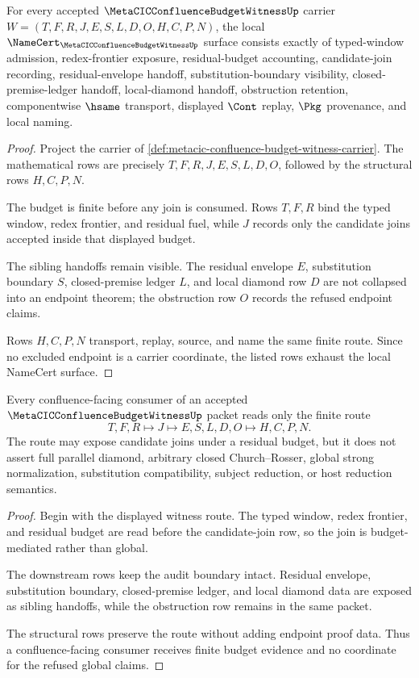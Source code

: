\begin{theorem}
\label{thm:metacic-confluence-budget-witness-namecert-obligations}
For every accepted $\MetaCICConfluenceBudgetWitnessUp$ carrier $W=(T,F,R,J,E,S,L,D,O,H,C,P,N)$, the local $\NameCert_{\MetaCICConfluenceBudgetWitnessUp}$ surface consists exactly of typed-window admission, redex-frontier exposure, residual-budget accounting, candidate-join recording, residual-envelope handoff, substitution-boundary visibility, closed-premise-ledger handoff, local-diamond handoff, obstruction retention, componentwise $\hsame$ transport, displayed $\Cont$ replay, $\Pkg$ provenance, and local naming.
\end{theorem}
\begin{proof}
Project the carrier of \autoref{def:metacic-confluence-budget-witness-carrier}. The mathematical rows are precisely $T,F,R,J,E,S,L,D,O$, followed by the structural rows $H,C,P,N$.

The budget is finite before any join is consumed. Rows $T,F,R$ bind the typed window, redex frontier, and residual fuel, while $J$ records only the candidate joins accepted inside that displayed budget.

The sibling handoffs remain visible. The residual envelope $E$, substitution boundary $S$, closed-premise ledger $L$, and local diamond row $D$ are not collapsed into an endpoint theorem; the obstruction row $O$ records the refused endpoint claims.

Rows $H,C,P,N$ transport, replay, source, and name the same finite route. Since no excluded endpoint is a carrier coordinate, the listed rows exhaust the local NameCert surface.
\end{proof}

\begin{theorem}
\label{thm:metacic-confluence-budget-witness-endpoint-boundary}
Every confluence-facing consumer of an accepted $\MetaCICConfluenceBudgetWitnessUp$ packet reads only the finite route
$$
T,F,R \longmapsto J \longmapsto E,S,L,D,O \longmapsto H,C,P,N .
$$
The route may expose candidate joins under a residual budget, but it does not assert full parallel diamond, arbitrary closed Church--Rosser, global strong normalization, substitution compatibility, subject reduction, or host reduction semantics.
\end{theorem}
\begin{proof}
Begin with the displayed witness route. The typed window, redex frontier, and residual budget are read before the candidate-join row, so the join is budget-mediated rather than global.

The downstream rows keep the audit boundary intact. Residual envelope, substitution boundary, closed-premise ledger, and local diamond data are exposed as sibling handoffs, while the obstruction row remains in the same packet.

The structural rows preserve the route without adding endpoint proof data. Thus a confluence-facing consumer receives finite budget evidence and no coordinate for the refused global claims.
\end{proof}

